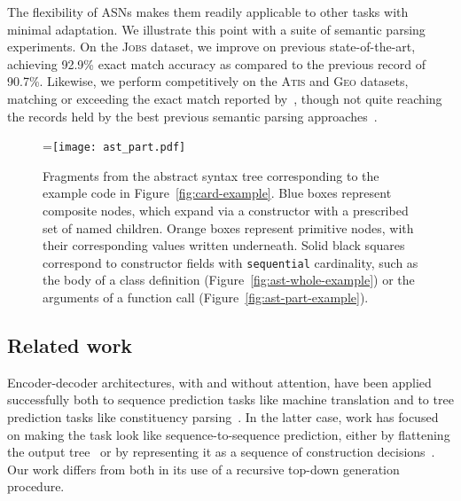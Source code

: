 \documentclass[11pt,a4paper]{article}
\newcommand{\Geo}{\textsc{Geo}\xspace}
\newcommand{\Jobs}{\textsc{Jobs}\xspace}
\newcommand{\Atis}{\textsc{Atis}\xspace}
\newcommand{\sequential}{{\tt sequential}\xspace}
\begin{document}
The flexibility of ASNs makes them readily applicable to other tasks with minimal adaptation. We illustrate this point with a suite of semantic parsing experiments. On the \Jobs dataset, we improve on previous state-of-the-art, achieving 92.9\% exact match accuracy as compared to the previous record of 90.7\%. Likewise, we perform competitively on the \Atis and \Geo datasets, matching or exceeding the exact match reported by~\citet{Dong16Semantic}, though not quite reaching the records held by the best previous semantic parsing approaches~\citep{Wang14Morpho}.



\begin{figure*}[t]
=\hbox{\texttt{[image: ast\_part.pdf]}}
\hfill
{}
\caption{Fragments from the abstract syntax tree corresponding to the example code in Figure~\ref{fig:card-example}. Blue boxes represent composite nodes, which expand via a constructor with a prescribed set of named children. Orange boxes represent primitive nodes, with their corresponding values written underneath. Solid black squares correspond to constructor fields with \sequential cardinality, such as the body of a class definition (Figure~\ref{fig:ast-whole-example}) or the arguments of a function call (Figure~\ref{fig:ast-part-example}).}
\end{figure*}

\subsection{Related work}



Encoder-decoder architectures, with and without attention, have been applied successfully both to sequence prediction tasks like machine translation and to tree prediction tasks like constituency parsing~\citep{Cross16Constituency,Dyer16RNNG,Vinyals15Foreign}. In the latter case, work has focused on making the task look like sequence-to-sequence prediction, either by flattening the output tree~\citep{Vinyals15Foreign} or by representing it as a sequence of construction decisions~\citep{Cross16Constituency,Dyer16RNNG}. Our work differs from both in its use of a recursive top-down generation procedure.
\end{document}
